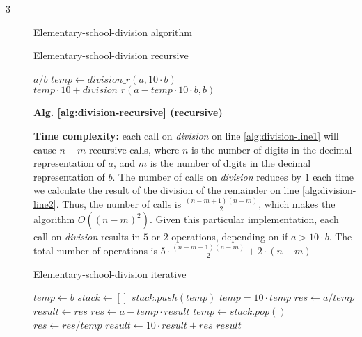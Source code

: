 \documentclass{article}
\begin{document}
\begin{description}
\item[3]{Elementary-school-division algorithm}

  \begin{algorithm}[h]
  \caption{Elementary-school-division recursive}
  \label{alg:division-recursive}
    \begin{algorithmic}[1]
        \State \Return $a / b$
      \Else {} 
        \State $temp \gets division\_r(a, 10 \cdot b)$ \label{alg:division-line1}
        \State \Return $temp \cdot 10 + division\_r(a - temp \cdot 10 \cdot b, b)$ \label{alg:division-line2}
      \EndIf
    \EndFunction
    \end{algorithmic}
  \end{algorithm}

  \textbf{Alg. \ref{alg:division-recursive} (recursive)}

  \textbf{Time complexity:} each call on \textit{division} on line \ref{alg:division-line1} will cause $n-m$ recursive calls, where $n$ is the number of digits in the decimal representation of $a$, and $m$ is the number of digits in the decimal representation of $b$. The number of calls on \textit{division} reduces by $1$ each time we calculate the result of the division of the remainder on line \ref{alg:division-line2}. Thus, the number of calls is $\frac{(n-m+1)(n-m)}{2}$, which makes the algorithm $O((n-m)^2)$. Given this particular implementation, each call on \textit{division} results in $5$ or $2$ operations, depending on if $a > 10 \cdot b$. The total number of operations is $5 \cdot \frac{(n-m-1)(n-m)}{2} + 2 \cdot (n-m)$

  \begin{algorithm}[h]
  \caption{Elementary-school-division iterative}
  \label{alg:division-iterative}
    \begin{algorithmic}[1]
      \State $temp \gets b$
      \State $stack \gets []$
        \State $stack.push(temp)$
        \State $temp = 10 \cdot temp$
      \EndWhile
      \State $res \gets a / temp$
      \State $result \gets res$
        \State $res \gets a - temp \cdot result$
        \State $temp \gets stack.pop()$
        \State $res \gets res / temp$
        \State $result \gets 10 \cdot result + res$
      \EndWhile
      \State \Return $result$
    \EndFunction
    \end{algorithmic}
  \end{algorithm}


\end{description}
\end{document}

